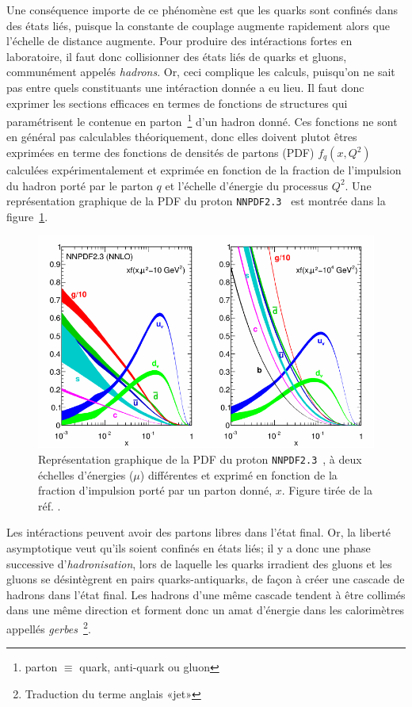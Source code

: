 Une conséquence importe de ce phénomène est que les quarks sont
confinés dans des états liés, puisque la constante de couplage
augmente rapidement alors que l'échelle de distance augmente. Pour
produire des intéractions fortes en laboratoire, il faut donc
collisionner des états liés de quarks et gluons, communément appelés
\emph{hadrons}. Or, ceci complique les calculs, puisqu'on ne sait pas
entre quels constituants une intéraction donnée a eu lieu. Il faut
donc exprimer les sections efficaces en termes de fonctions de
structures qui paramétrisent le contenue en parton~\footnote{parton
  $\equiv$ quark, anti-quark ou gluon} d'un hadron donné. Ces
fonctions ne sont en général pas calculables théoriquement, donc elles
doivent plutot êtres exprimées en terme des fonctions de densités de
partons (PDF) $f_q(x,Q^2)$ calculées expérimentalement et exprimée en
fonction de la fraction de l'impulsion du hadron porté par le parton
$q$ et l'échelle d'énergie du processus $Q^2$. Une représentation
graphique de la PDF du proton
\texttt{NNPDF2.3}~\cite{ball_parton_2013} est montrée dans la
figure~\ref{fig:pdf}.

\begin{figure}
  \centering
  \includegraphics{nnpdf23.pdf}
  \caption{Représentation graphique de la PDF du proton
    \texttt{NNPDF2.3}~\cite{ball_parton_2013}, à deux échelles
    d'énergies ($\mu$) différentes et exprimé en fonction de la
    fraction d'impulsion porté par un parton donné, $x$. Figure tirée de la
    réf. \cite{olive_review_2014}.}
  \label{fig:pdf}
\end{figure}

Les intéractions peuvent avoir des partons libres dans l'état
final. Or, la liberté asymptotique veut qu'ils soient confinés en
états liés; il y a donc une phase successive d'\emph{hadronisation},
lors de laquelle les quarks irradient des gluons et les gluons se
désintègrent en pairs quarks-antiquarks, de façon à créer une cascade
de hadrons dans l'état final. Les hadrons d'une même cascade tendent à
être collimés dans une même direction et forment donc un amat
d'énergie dans les calorimètres appellés
\emph{gerbes}~\footnote{Traduction du terme anglais «jet»}. 

